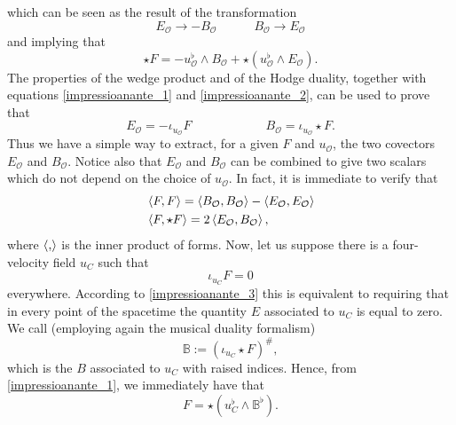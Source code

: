 \documentclass[usenatbib%
]{mnras}
\newcommand{\spc}{\quad \quad \quad}
\begin{document}
which can be seen as the result of the transformation 
\begin{equation}
E_{\mathcal{O}} \rightarrow -B_{\mathcal{O}}   \spc  B_{\mathcal{O}} \rightarrow E_{\mathcal{O}} 
\end{equation}
and implying that
\begin{equation}\label{impressioanante_2}
\star F = - u_{\mathcal{O}}^\flat \wedge B_{\mathcal{O}} + \star(u_{\mathcal{O}}^\flat \wedge E_{\mathcal{O}}).
\end{equation}
The properties of the wedge product and of the Hodge duality, together with  equations \eqref{impressioanante_1} and \eqref{impressioanante_2}, can be used to prove that
\begin{equation}\label{impressioanante_3}
E_{\mathcal{O}} = - \iota_{u_{\mathcal{O}}} F  \spc  \spc  B_{\mathcal{O}} =  \iota_{u_{\mathcal{O}}} {\star}F.
\end{equation}
Thus we have a simple way to extract, for a given $F$ and $u_{\mathcal{O}}$, the two covectors $E_{\mathcal{O}}$ and $B_{\mathcal{O}}$. Notice also that $E_{\mathcal{O}}$ and $B_{\mathcal{O}}$ can be combined to give two scalars which do not depend on the choice of $u_{\mathcal{O}}$. In fact, it is immediate to verify that
\begin{equation}\label{equestapasserallastoria}
\begin{split}
& \braket{F,F} = \braket{B_{\mathcal{O}},B_{\mathcal{O}}}-\braket{E_{\mathcal{O}},E_{\mathcal{O}}}  \\  
&\braket{F,{\star}F} = 2\braket{E_{\mathcal{O}},B_{\mathcal{O}}},
\end{split}
\end{equation}
where $\braket{,}$ is the inner product of forms. 
Now, let us suppose there is a four-velocity field $u_C$ such that
\begin{equation}\label{mnbvcx}
\iota_{u_C} F =0
\end{equation}
everywhere. According to \eqref{impressioanante_3} this is equivalent to requiring that in every point of the spacetime the quantity $E$ associated to $u_C$ is equal to zero. We call (employing again the musical duality formalism)
\begin{equation}
\mathbb{B} := (\iota_{u_C} {\star}F)^\#,
\end{equation} 
which is the $B$ associated to $u_C$ with raised indices. Hence, from \eqref{impressioanante_1}, we immediately have that 
\begin{equation}\label{topologicamenteimmenso}
F = \star(u_C^\flat \wedge \mathbb{B}^\flat).
\end{equation}
\end{document}
